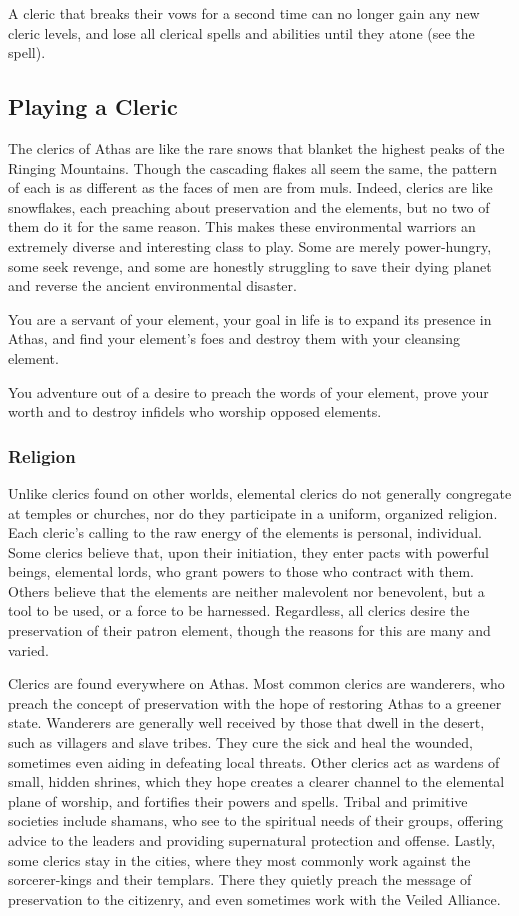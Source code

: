 A cleric that breaks their vows for a second time can no longer gain any new cleric levels, and lose all clerical spells and abilities until they atone (see the  spell).

\subsection{Playing a Cleric}
The clerics of Athas are like the rare snows that blanket the highest peaks of the Ringing Mountains. Though the cascading flakes all seem the same, the pattern of each is as different as the faces of men are from muls. Indeed, clerics are like snowflakes, each preaching about preservation and the elements, but no two of them do it for the same reason. This makes these environmental warriors an extremely diverse and interesting class to play. Some are merely power-hungry, some seek revenge, and some are honestly struggling to save their dying planet and reverse the ancient environmental disaster.

You are a servant of your element, your goal in life is to expand its presence in Athas, and find your element's foes and destroy them with your cleansing element.

You adventure out of a desire to preach the words of your element, prove your worth and to destroy infidels who worship opposed elements.

\subsubsection{Religion}
Unlike clerics found on other worlds, elemental clerics do not generally congregate at temples or churches, nor do they participate in a uniform, organized religion. Each cleric's calling to the raw energy of the elements is personal, individual. Some clerics believe that, upon their initiation, they enter pacts with powerful beings, elemental lords, who grant powers to those who contract with them. Others believe that the elements are neither malevolent nor benevolent, but a tool to be used, or a force to be harnessed. Regardless, all clerics desire the preservation of their patron element, though the reasons for this are many and varied.

Clerics are found everywhere on Athas. Most common clerics are wanderers, who preach the concept of preservation with the hope of restoring Athas to a greener state. Wanderers are generally well received by those that dwell in the desert, such as villagers and slave tribes. They cure the sick and heal the wounded, sometimes even aiding in defeating local threats. Other clerics act as wardens of small, hidden shrines, which they hope creates a clearer channel to the elemental plane of worship, and fortifies their powers and spells. Tribal and primitive societies include shamans, who see to the spiritual needs of their groups, offering advice to the leaders and providing supernatural protection and offense. Lastly, some clerics stay in the cities, where they most commonly work against the sorcerer-kings and their templars. There they quietly preach the message of preservation to the citizenry, and even sometimes work with the Veiled Alliance.

